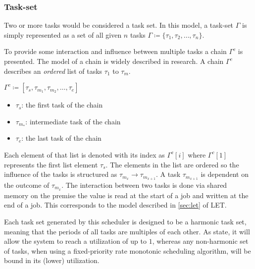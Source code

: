 \subsubsection{Task-set}\label{sec:taskset}
Two or more tasks would be considered a task set.
In this model, a task-set $\Gamma$ is simply represented as a set of all given $n$ tasks $\Gamma \coloneqq \{\tau_1, \tau_2, \ldots, \tau_n\}$.

To provide some interaction and influence between multiple tasks a chain $\Gamma^c$ is presented.
The model of a chain is widely described in research\cite{
beckerSynthesizingJoblevelDependencies2016,abdullahWorstcaseCauseeffectReaction2019,choiChainBasedFixedPriorityScheduling2020}.
A chain $\Gamma^c$ describes an \textit{ordered} list of tasks $\tau_1$ to $\tau_m$.
\begin{center}
  $\Gamma^c \coloneqq [\tau_s,\tau_{m_1},\tau_{m_2}, \ldots, \tau_e]$
\end{center}
\begin{itemize}
  \item $\tau_s$: the first task of the chain
  \item $\tau_{m_*}$: intermediate task of the chain
  \item $\tau_e$: the last task of the chain
\end{itemize}
Each element of that list is denoted with its index as $\Gamma^c[i]$ where $\Gamma^c[1]$ represents the first list element $\tau_s$\cite{choiChainBasedFixedPriorityScheduling2020}.
The elements in the list are ordered so the influence of the tasks is structured as $\tau_{m_x} \rightarrow \tau_{m_{x+1}}$.
A task $\tau_{m_{x+1}}$ is dependent on the outcome of $ \tau_{m_{x}}$.
The interaction between two tasks is done via shared memory on the premise the value is read at the start of a job and written at the end of a job\cite{choiChainBasedFixedPriorityScheduling2020}.
This corresponds to the model described in \cref{sec:let} of \ac{LET}.

Each task set generated by this scheduler is designed to be a harmonic task set, meaning that the periods of all tasks are multiples of each other\cite{liuSchedulingAlgorithmsMultiprogramming1973,kuoLoadAdjustmentAdaptive1991}.
As \textcite{liuSchedulingAlgorithmsMultiprogramming1973} state, it will allow the system to reach a utilization of up to $1$, whereas any non-harmonic set of tasks, when using a fixed-priority rate monotonic scheduling algorithm, will be bound in its (lower) utilization.

